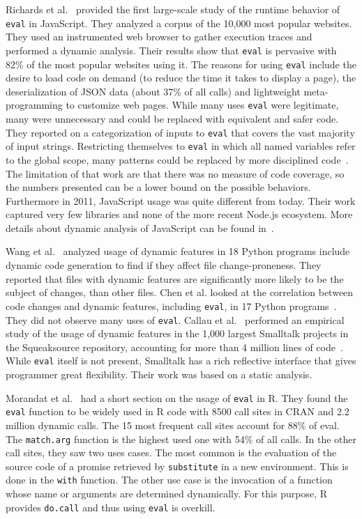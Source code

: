 \documentclass[USenglish,cleveref, autoref, thm-restate]{lipics-v2019}
\newcommand{\eval}{\texttt{eval}\xspace}
\renewcommand{\c}[1]{\lstinline{#1}\xspace}
\begin{document}
Richards et al.~\cite{ecoop11} provided the first large-scale study of the
runtime behavior of \eval in JavaScript. They analyzed a corpus of the
10,000 most popular websites. They used an instrumented web browser to
gather execution traces and performed a dynamic analysis.  Their results show
that \eval is pervasive with 82\% of the most popular websites using it. The
reasons for using \eval include the desire to load code on demand (to reduce
the time it takes to display a page), the deserialization of JSON data
(about 37\% of all calls) and lightweight meta-programming to customize web
pages.  While many uses \eval were legitimate, many were unnecessary and
could be replaced with equivalent and safer code.  They reported on a
categorization of inputs to \eval that covers the vast majority of input
strings.  Restricting themselves to \eval in which all named variables refer
to the global scope, many patterns could be replaced by more disciplined
code~\cite{oopsla12b}.  The limitation of that work are that there was no
measure of code coverage, so the numbers presented can be a lower bound on
the possible behaviors.  Furthermore in 2011, JavaScript usage was quite
different from today. Their work captured very few libraries and none of the
more recent Node.js ecosystem.  More details about dynamic analysis of
JavaScript can be found in~\cite{liang}.

Wang et al.~\cite{wang} analyzed usage of dynamic features in 18 Python
programs include dynamic code generation to find if they affect file
change-proneness.  They reported that files with dynamic features are
significantly more likely to be the subject of changes, than other files.
Chen et al. looked at the correlation between code changes and dynamic
features, including \eval, in 17 Python programs~\cite{chen}. They did not
observe many uses of \eval.  Callau et al.~\cite{oscar} performed an empirical study of
the usage of dynamic features in the 1,000 largest Smalltalk projects in the
Squeaksource repository, accounting for more than 4 million lines of
code~\cite{oscar}. While \eval itself is not present, Smalltalk has a rich
reflective interface that gives programmer great flexibility. Their work was
based on a static analysis.

Morandat et al.~\cite{ecoop12} had a short section on the usage of \eval in
R. They found the \eval function to be widely used in R code with 8500 call
sites in CRAN and 2.2 million dynamic calls. The 15 most frequent call sites
account for 88\% of eval. The \c{match.arg} function is the highest used one
with 54\% of all calls. In the other call sites, they saw two uses
cases. The most common is the evaluation of the source code of a promise
retrieved by \c{substitute} in a new environment. This is done in the
\c{with} function. The other use case is the invocation of a function whose
name or arguments are determined dynamically. For this purpose, R provides
\c{do.call} and thus using \eval is overkill.
\end{document}
